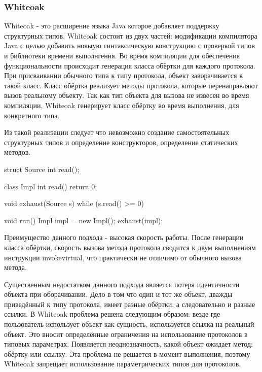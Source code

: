 \subsubsection{Whiteoak}
Whiteoak - это расширение языка Java которое добавляет поддержку структурных типов\cite{whiteoak}. Whiteoak состоит из двух частей: модификации компилятора Java с целью добавить новыую синтаксическую конструкцию с проверкой типов и библиотеки времени выполнгения. Во время компиляции для обеспечения функциональности происходит генерация класса обёртки для каждого протокола. При присваивании обычного типа к типу протокола, объект заворачивается в такой класс. Класс обёртка реализует методы протокола, которые перенаправляют вызов реальному объекту. Так как тип объекта для вызова не извесен во время компиляции, Whiteoak генерирует класс обёртку во время выполнения, для конкретного типа.

Из такой реализации следует что невозможно создание самостоятельных структурных типов и определение конструкторов, определение статических методов.

\begin{pyglist}[language=java]
struct Source { 
    int read();
}

class Impl {
    int read() {
        return 0;
    }
}

void exhaust(Source s) {
    while (s.read() >= 0) {
    }
}

void run() {
    Impl impl = new Impl();
    exhaust(impl);
}

\end{pyglist}

Преимущество данного подхода - высокая скорость работы. После генерации класса обёртки, скорость вызова метода протокола сводится к двум выполнениям инструкции invokevirtual, что практически не отличимо от обычного вызова метода.

Существенным недостатком данного подхода является потеря идентичности объекта при оборачивании. Дело в том что один и тот же объект, дважды приведённый к типу протокола, имеет разные обёртки, а следовательно и разные ссылки. В Whiteoak проблема решена следующим образом: везде где пользователь использует объект как сущность, используется ссылка на реальный объект. Это вносит определённые ограничения на использование протоколов в типовых параметрах. Появляется неоднозначность, какой объект ожидает метод: обёртку или ссылку. Эта проблема не решается в момент выполнения, поэтому Whiteoak запрещает использование параметрических типов для протоколов.
